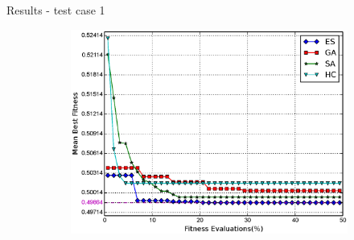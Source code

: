 \documentclass{beamer}
\begin{document}
\begin{frame}{Results - test case 1}
\begin{figure}
\begin{subfigure}{.5\columnwidth}
            \includegraphics[width=\columnwidth, height=\columnwidth]{../paper/FIG/tc1_mf}%
        \end{subfigure}\hfill\\%
    \end{figure}
\end{frame}
\end{document}
